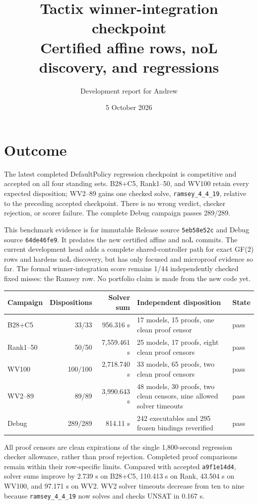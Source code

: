 \documentclass[11pt]{article}
\title{Tactix winner-integration checkpoint\\Certified affine rows, noL discovery, and regressions}
\author{Development report for Andrew}
\date{5 October 2026}
\newcommand{\code}[1]{\texttt{#1}}
\newcommand{\pass}{\textcolor{green!45!black}{pass}}
\begin{document}
\maketitle

\section*{Outcome}

The latest completed DefaultPolicy regression checkpoint is competitive and
accepted on all four standing sets.  B28+C5, Rank1--50, and WV100 retain every
expected disposition; WV2--89 gains one checked solve, \code{ramsey\_4\_4\_19},
relative to the preceding accepted checkpoint.  There is no wrong verdict,
checker rejection, or scorer failure.  The complete Debug campaign passes
289/289.

This benchmark evidence is for immutable Release source \code{5eb58e52c} and
Debug source \code{64de46fe9}.  It predates the new certified affine and noL
commits.  The current development head adds a complete shared-controller path
for exact GF(2) rows and hardens noL discovery, but has only focused and
microproof evidence so far.  The formal winner-integration score remains
1/44 independently checked fixed misses: the Ramsey row.  No portfolio claim
is made from the new code yet.

\begin{center}
\begin{tabularx}{\textwidth}{@{}lrrXl@{}}
\toprule
Campaign & Dispositions & Solver sum & Independent disposition & State \\
\midrule
B28+C5 & 33/33 & 956.316 s & 17 models, 15 proofs, one clean proof censor & \pass \\
Rank1--50 & 50/50 & 7,559.461 s & 25 models, 17 proofs, eight clean proof censors & \pass \\
WV100 & 100/100 & 2,718.740 s & 33 models, 65 proofs, two clean proof censors & \pass \\
WV2--89 & 89/89 & 3,990.643 s & 48 models, 30 proofs, two clean censors, nine allowed solver timeouts & \pass \\
Debug & 289/289 & 814.11 s & 242 executables and 295 frozen bindings reverified & \pass \\
\bottomrule
\end{tabularx}
\end{center}

All proof censors are clean expirations of the single 1,800-second regression
checker allowance, rather than proof rejection.  Completed proof comparisons
remain within their row-specific limits.  Compared with accepted
\code{a9f1e14d4}, solver sums improve by 2.739 s on B28+C5, 110.413 s on Rank,
43.504 s on WV100, and 97.171 s on WV2.  WV2 solver timeouts decrease from ten
to nine because \code{ramsey\_4\_4\_19} now solves and checks UNSAT in 0.167 s.
\end{document}

